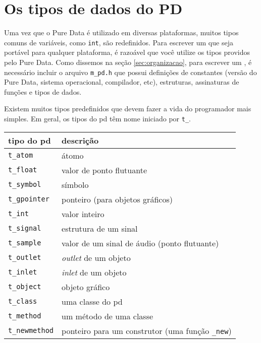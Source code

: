 
\chapter{Os tipos de dados do PD}

Uma vez que o Pure Data é utilizado em diversas plataformas, muitos tipos
comuns de variáveis, como \texttt{int}, são redefinidos. Para escrever um
\external que seja portável para qualquer plataforma, é razoável que você
utilize os tipos providos pelo Pure Data. Como dissemos na seção
\ref{sec:organizacao}, para escrever um \external, é necessário incluir o
arquivo \texttt{m\_pd.h} que possui definições de constantes (versão do Pure
Data, sistema operacional, compilador, etc), estruturas, assinaturas de
funções e tipos de dados.

Existem muitos tipos predefinidos que devem fazer a vida do programador mais
simples. Em geral, os tipos do pd têm nome iniciado por \texttt{t\_}.

\begin{center}
\begin{tabular}{|l|l|}
\hline
tipo do pd & descrição \\
\hline
\texttt{t\_atom} & átomo \\
\texttt{t\_float} & valor de ponto flutuante \\
\texttt{t\_symbol} & símbolo \\
\texttt{t\_gpointer} & ponteiro (para objetos gráficos) \\
\texttt{t\_int} & valor inteiro \\
\texttt{t\_signal} & estrutura de um sinal \\
\texttt{t\_sample} & valor de um sinal de áudio (ponto flutuante) \\
\texttt{t\_outlet} & \emph{outlet} de um objeto \\
\texttt{t\_inlet} & \emph{inlet} de um objeto \\
\texttt{t\_object} & objeto gráfico \\
\texttt{t\_class} & uma classe do pd \\
\texttt{t\_method} & um método de uma classe \\
\texttt{t\_newmethod} & ponteiro para um construtor (uma função \texttt{\_new}) \\
\hline
\end{tabular}
\end{center}

